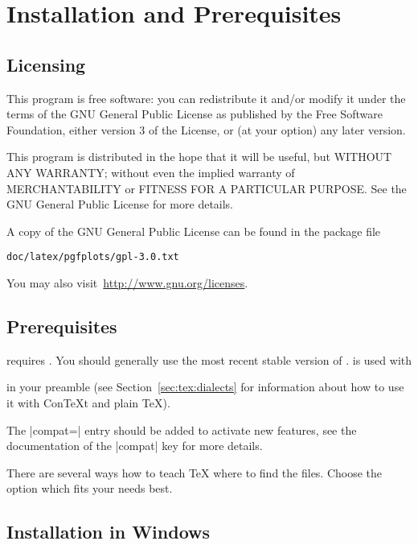 
\section[install]{Installation and Prerequisites}

\subsection{Licensing}

This program is free software: you can redistribute it and/or modify it under
the terms of the GNU General Public License as published by the Free Software
Foundation, either version 3 of the License, or (at your option) any later
version.

This program is distributed in the hope that it will be useful, but WITHOUT ANY
WARRANTY; without even the implied warranty of MERCHANTABILITY or FITNESS FOR A
PARTICULAR PURPOSE.  See the GNU General Public License for more details.

A copy of the GNU General Public License can be found in the package file
%
\begin{verbatim}
doc/latex/pgfplots/gpl-3.0.txt
\end{verbatim}
%
You may also visit~\url{http://www.gnu.org/licenses}.


\subsection{Prerequisites}

\PGFPlots{} requires \PGF{}. You should generally use the most recent stable
version of \PGF{}. \PGFPlots{} is used with
%

%
\noindent in your preamble (see Section~\ref{sec:tex:dialects} for information
about how to use it with Con\TeX{}t and plain \TeX{}).

The |compat=| entry should be added to activate new features,
see the documentation of the |compat| key for more details.



There are several ways how to teach \TeX{} where to find the files. Choose the
option which fits your needs best.


\subsection{Installation in Windows}

